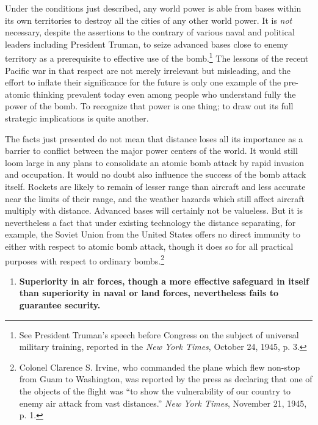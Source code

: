 Under the conditions just described, any world power is able from bases within its own territories to destroy all the cities of any other world power. It is \emph{not} necessary, despite the assertions to the contrary of various naval and political leaders including President Truman, to seize advanced bases close to enemy territory as a prerequisite to effective use of the bomb.\footnote{See President Truman's speech before Congress on the subject of universal military training, reported in the \textit{New York Times}, October 24, 1945, p. 3.} The lessons of the recent Pacific war in that respect are not merely irrelevant but misleading, and the effort to inflate their significance for the future is only one example of the pre-atomic thinking prevalent today even among people who understand fully the power of the bomb. To recognize that power is one thing; to draw out its full strategic implications is quite another.

The facts just presented do not mean that distance loses all its importance as a barrier to conflict between the major power centers of the world. It would still loom large in any plans to consolidate an atomic bomb attack by rapid invasion and occupation. It would no doubt also influence the success of the bomb attack itself. Rockets are likely to remain of lesser range than aircraft and less accurate near the limits of their range, and the weather hazards which still affect aircraft multiply with distance. Advanced bases will certainly not be valueless. But it is nevertheless a fact that under existing technology the distance separating, for example, the Soviet Union from the United States offers no direct immunity to either with respect to atomic bomb attack, though it does so for all practical purposes with respect to ordinary bombs.\footnote{Colonel Clarence S. Irvine, who commanded the plane which flew non-stop from Guam to Washington, was reported by the press as declaring that one of the objects of the flight was ``to show the vulnerability of our country to enemy air attack from vast distances.'' \textit{New York Times}, November 21, 1945, p. 1.}

\label{I-range2}

\begin{enumerate}[resume*]

\item \textbf{Superiority in air forces, though a more effective safeguard in itself than superiority in naval or land forces, nevertheless fails to guarantee security.}

\end{enumerate}

